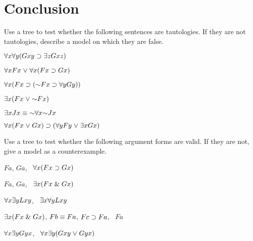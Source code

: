 \label{rule:IdI}




\label{rule:IdE}








\section{Conclusion}%
  \label{sec:Conclusion}
  



\iffalse

\practiceproblems

\solutions
\problempart
\label{pr.QL.trees.tautology}
Use a tree to test whether the following sentences are tautologies. If they are not tautologies, describe a model on which they are false.
\begin{earg}
\item $\forall x \forall y (Gxy \supset \exists z Gxz)$
\item $\forall x Fx \mkern1mu\vee\mkern1mu \forall x (Fx \supset Gx)$
\item $\qt{\forall}{x} (Fx \eif (\enot Fx \eif \qt{\forall}{y} Gy))$
\item $\qt{\exists}{x} (Fx \eor \enot Fx)$
\item $\qt{\exists}{x} Jx \eiff \enot \qt{\forall}{x} \enot Jx$
\item $\forall x (Fx \mkern1mu\vee\mkern1mu Gx) \supset (\forall y Fy \mkern1mu\vee\mkern1mu \exists x Gx)$
\end{earg}

\solutions
\problempart
\label{pr.QL.trees.validity}
Use a tree to test whether the following argument forms are valid. If they are not, give a model as a counterexample.
\begin{earg}
\item $Fa$, $Ga$, \therefore\ $\forall x (Fx \supset Gx)$
\item $Fa$, $Ga$, \therefore\ $\exists x (Fx \mathrel\& Gx)$
\item $\forall x \exists y Lxy$, \therefore\ $\exists x \forall y Lxy$
\item $\exists x (Fx \mathrel\& Gx)$, $Fb \equiv Fa$, $Fc \supset Fa$, \therefore\ $Fa$
\item $\forall x \exists y Gyx$, \therefore\ $\forall x \exists y (Gxy \mkern1mu\vee\mkern1mu Gyx)$
\end{earg}


